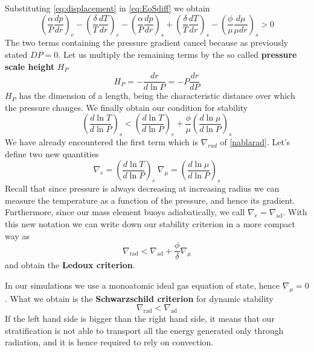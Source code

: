 Substituting \ref{eq:displacement} in \ref{eq:EoSdiff} we obtain
\begin{equation}
	\left (\frac{\alpha}{P} \frac{dp}{dr}\right )_e - \left ( \frac{\delta}{T}\frac{dT}{dr}\right )_e -  \left (\frac{\alpha}{P} \frac{dp}{dr}\right )_s +  \left ( \frac{\delta}{T}\frac{dT}{dr}\right )_s -  \left ( \frac{\phi}{\mu}\frac{d \mu}{\mu dr}\right )_s>0 
\end{equation}
The two terms containing the pressure gradient cancel because as previously stated $DP=0$. Let us multiply the remaining terms by the so called \textbf{pressure scale height} $H_P$
\begin{equation}\label{scaleheight}
	H_P=-\frac{dr}{d \ln P}= - P \frac{dr}{dP}
\end{equation}
$H_P$ has the dimension of a length, being the characteristic distance over which the pressure changes.
We finally obtain our condition for stability
\begin{equation}\label{criterionstab}
	\left (   \frac{d \ln T}{d \ln P}    \right )_s <  \left (   \frac{d \ln T}{d \ln P}   \right )_e +  \frac{\phi}{\mu} \left (   \frac{d \ln \mu}{d \ln P}    \right )_s
\end{equation}
We have already encountered the first term which is $\nabla_{rad}$ of \ref{nablarad}.
Let's define two new quantities
\begin{equation}\label{nablas}
	\nabla_{e} = \left (  \frac{d \ln T}{d \ln P}   \right )_e \  \nabla_{\mu} = \left (  \frac{d \ln \mu}{d \ln P}   \right )_s
\end{equation}
Recall that since pressure is always decreasing at increasing radius we can measure the temperature as a function of the pressure, and hence its gradient. Furthermore, since our mass element buoys adiabatically, we call $\nabla_e=\nabla_{\mathrm{ad}}$. 
With this new notation we can write down our stability criterion in a more compact way as
\begin{equation}\label{stabcritcomp}
	\nabla_{\mathrm{rad}} < \nabla_{\mathrm{ad}} + \frac{\phi}{\delta} \nabla_{\mu}
\end{equation}
and obtain the \textbf{Ledoux criterion}. 

In our simulations we use a monoatomic ideal gas equation of state, hence $\nabla_{\mu}=0$. What we obtain is the \textbf{Schwarzschild criterion} for dynamic stability
\begin{equation}\label{schwarzschild}
	\nabla_{\mathrm{rad}}<\nabla_{\mathrm{ad}}
\end{equation}
If the left hand side is bigger than the right hand side, it means that our stratification is not able to transport all the energy generated only through radiation, and it is hence required to rely on convection. 


